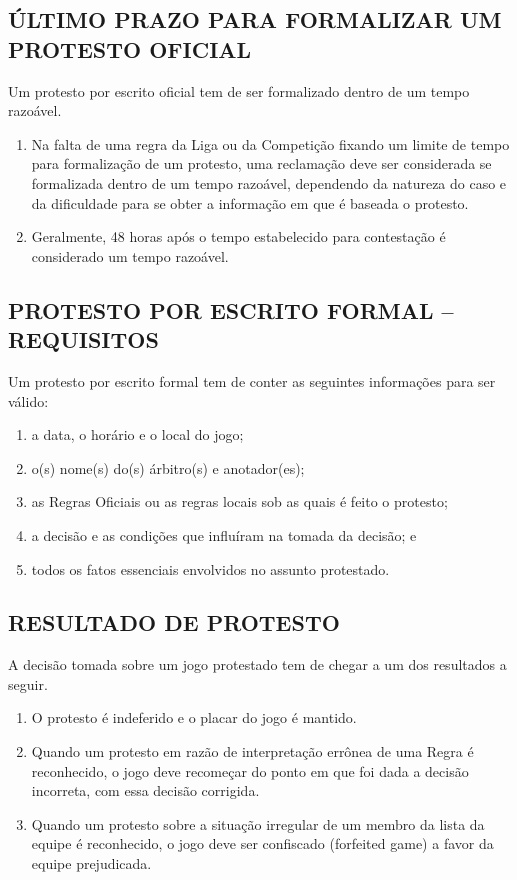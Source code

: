 \subsection{ÚLTIMO PRAZO PARA FORMALIZAR UM PROTESTO OFICIAL}
Um protesto por escrito oficial tem de ser formalizado dentro de um tempo razoável.

\begin{enumerate}[label=(\alph*)]
	\item Na falta de uma regra da Liga ou da Competição fixando um limite de tempo para formali\-za\-ção de um protesto, uma reclamação deve ser considerada se formalizada dentro de um tempo razoável, dependendo da natureza do caso e da dificuldade para se obter a informação em que é baseada o protesto.
	\item Geralmente, 48 horas após o tempo estabelecido para contestação é considerado um tempo razoável.
\end{enumerate}

\subsection{PROTESTO POR ESCRITO FORMAL -- REQUISITOS}

Um protesto por escrito formal tem de conter as seguintes informações para ser válido:
\begin{enumerate}[label=(\alph*)]
	\item a data, o horário e o local do jogo;
	\item o(s) nome(s) do(s) árbitro(s) e anotador(es);
	\item as Regras Oficiais ou as regras locais sob as quais é feito o protesto;
	\item a decisão e as condições que influíram na tomada da decisão; e
	\item todos os fatos essenciais envolvidos no assunto protestado.
\end{enumerate}

\subsection{RESULTADO DE PROTESTO}

A decisão tomada sobre um jogo protestado tem de chegar a um dos resultados a seguir.

\begin{enumerate}[label=(\alph*)]
	\item O protesto é indeferido e o placar do jogo é mantido.
	\item Quando um protesto em razão de interpretação errônea de uma Regra é  reconhecido, o jogo deve recomeçar do ponto em que foi dada a decisão incorreta, com essa decisão corrigida.
	\item Quando um protesto sobre a situação irregular de um membro da lista da  equipe é reconhecido, o jogo deve ser confiscado (\gls{forfeited game}) a favor da  equipe prejudicada.
\end{enumerate}

